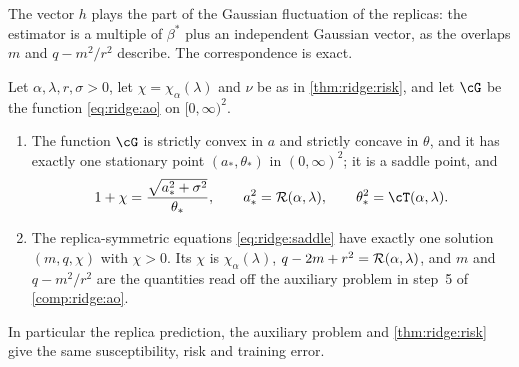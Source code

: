 \begin{refsection}
The vector $h$ plays the part of the Gaussian fluctuation of the replicas: the estimator is a multiple of $\beta^*$ plus an independent Gaussian vector, as the overlaps $m$ and $q-m^2/r^2$ describe. The correspondence is exact.

\begin{proposition}\label{prop:ridge:identity}
Let $\alpha,\lambda,r,\sigma>0$, let $\chi=\chi_\alpha(\lambda)$ and $\nu$ be as in \cref{thm:ridge:risk}, and let $\cG$ be the function \eqref{eq:ridge:ao} on $[0,\infty)^2$.
\begin{enumerate}
\item The function $\cG$ is strictly convex in $a$ and strictly concave in $\theta$, and it has exactly one stationary point $(a_*,\theta_*)$ in $(0,\infty)^2$; it is a saddle point, and
\[
1+\chi=\frac{\sqrt{a_*^2+\sigma^2}}{\theta_*},\qquad a_*^2=\ridgeR(\alpha,\lambda),\qquad\theta_*^2=\cT(\alpha,\lambda).
\]
\item The replica-symmetric equations \eqref{eq:ridge:saddle} have exactly one solution $(m,q,\chi)$ with $\chi>0$. Its $\chi$ is $\chi_\alpha(\lambda)$, $q-2m+r^2=\mathcal{R}(\alpha,\lambda)$, and $m$ and $q-m^2/r^2$ are the quantities read off the auxiliary problem in step~5 of \cref{comp:ridge:ao}.
\end{enumerate}
In particular the replica prediction, the auxiliary problem and \cref{thm:ridge:risk} give the same susceptibility, risk and training error.
\end{proposition}


\end{refsection}
